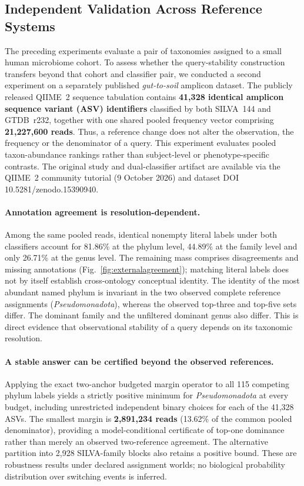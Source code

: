 \subsection{Independent Validation Across Reference Systems}
\label{sec:externalvalidation}
The preceding experiments evaluate a pair of taxonomies assigned to a small human microbiome cohort. To assess whether the query-stability construction transfers beyond that cohort and classifier pair, we conducted a second experiment on a separately published \emph{gut-to-soil} amplicon dataset. The publicly released QIIME~2 sequence tabulation contains \textbf{41,328 identical amplicon sequence variant (ASV) identifiers} classified by both SILVA~144 and GTDB~r232, together with one shared pooled frequency vector comprising \textbf{21,227,600 reads}. Thus, a reference change does not alter the observation, the frequency or the denominator of a query. This experiment evaluates pooled taxon-abundance rankings rather than subject-level or phenotype-specific contrasts. The original study and dual-classifier artifact are available via the QIIME~2 community tutorial (9 October 2026) and dataset DOI 10.5281/zenodo.15390940.

\paragraph{Annotation agreement is resolution-dependent.}
Among the same pooled reads, identical nonempty literal labels under both classifiers account for 81.86\% at the phylum level, 44.89\% at the family level and only 26.71\% at the genus level. The remaining mass comprises disagreements and missing annotations (Fig.~\ref{fig:externalagreement}); matching literal labels does not by itself establish cross-ontology conceptual identity. The identity of the most abundant named phylum is invariant in the two observed complete reference assignments (\emph{Pseudomonadota}), whereas the observed top-three and top-five sets differ. The dominant family and the unfiltered dominant genus also differ. This is direct evidence that observational stability of a query depends on its taxonomic resolution.

\paragraph{A stable answer can be certified beyond the observed references.}
Applying the exact two-anchor budgeted margin operator to all 115 competing phylum labels yields a strictly positive minimum for \emph{Pseudomonadota} at every budget, including unrestricted independent binary choices for each of the 41,328 ASVs. The smallest margin is \textbf{2,891,234 reads} (13.62\% of the common pooled denominator), providing a model-conditional certificate of top-one dominance rather than merely an observed two-reference agreement. The alternative partition into 2,928 SILVA-family blocks also retains a positive bound. These are robustness results under declared assignment worlds; no biological probability distribution over switching events is inferred.

